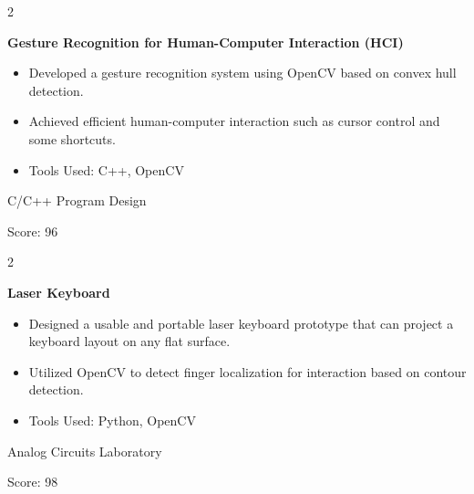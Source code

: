 \documentclass[10pt, letterpaper]{article}
\newenvironment{highlights}{
    \begin{itemize}[
        topsep=0.10 cm,
        parsep=0.10 cm,
        partopsep=0pt,
        itemsep=0pt,
        leftmargin=0.4 cm + 10pt
    ]
}{
    \end{itemize}
} %
\newenvironment{twocolentry}[2][]{
    \onecolentry
    \def\secondColumn{#2}
    \setcolumnwidth{\fill, 4.5 cm}
    \begin{paracol}{2}
}{
    \switchcolumn \raggedleft \secondColumn
    \end{paracol}
    \endonecolentry
} %
\let\hrefWithoutArrow\href
\renewcommand{\href}[2]{\hrefWithoutArrow{#1}{\ifthenelse{\equal{#2}{}}{ }{#2 }\raisebox{.15ex}{\footnotesize \faExternalLink*}}}
\begin{document}
        \vspace{0.1 cm}

        \begin{twocolentry}{
            \small{C/C++ Program Design}
            
            Score: 96 \href{https://github.com/Smangic/SUSTe}{[Github]}
        }
            \textbf{Gesture Recognition for Human-Computer Interaction (HCI)}
            \begin{highlights}
                \item \small{Developed a gesture recognition system using OpenCV based on convex hull detection.}
                \item Achieved efficient human-computer interaction such as cursor control and some shortcuts.
                \item Tools Used: C++, OpenCV
            \end{highlights}
        \end{twocolentry}



            


        \vspace{0.1 cm}
        \begin{twocolentry}{
            \small{Analog Circuits Laboratory}
            
            Score: 98\href{https://github.com/Smangic/Laser-keyboard}{[Github]}
        }
            \textbf{Laser Keyboard}
            \begin{highlights}
                \item \small{Designed a usable and portable laser keyboard prototype that can project a keyboard layout on any flat surface.}
                \item Utilized OpenCV to detect finger localization for interaction based on contour detection.
                \item Tools Used: Python, OpenCV
            \end{highlights}
        \end{twocolentry}
\end{document}
